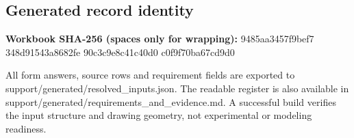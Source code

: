 \documentclass[11pt]{article}
\begin{document}
\subsection*{Generated record identity}
\textbf{Workbook SHA-256 (spaces only for wrapping):} 9485aa3457f9bef7 348d91543a8682fe 90c3c9e8c41c40d0 c0f9f70ba67cd9d0\par
All form answers, source rows and requirement fields are exported to support/generated/resolved\_inputs.json. The readable register is also available in support/generated/requirements\_and\_evidence.md. A successful build verifies the input structure and drawing geometry, not experimental or modeling readiness.
\end{document}
